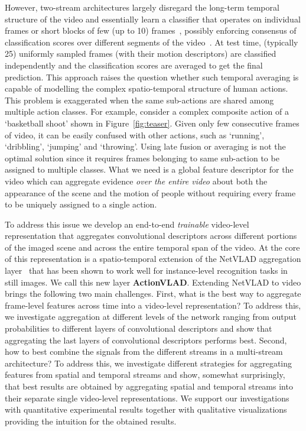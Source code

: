 \documentclass[10pt,twocolumn,letterpaper]{article}
\newcommand{\methodTag}[0]{ActionVLAD}
\begin{document}
However, two-stream architectures largely disregard the long-term  temporal structure of the video and essentially learn a classifier that operates on individual frames or short blocks of few (up to 10) frames~\cite{Simonyan_14b}, possibly enforcing consensus of classification scores  over different segments of the video~\cite{WangL_16a}.
At test time,  (typically 25) uniformly  sampled frames (with their motion descriptors) are classified independently and the classification scores are averaged to get the final prediction. 
This approach raises the question whether such temporal averaging is capable of modelling the complex
spatio-temporal structure of human actions. This problem is exaggerated
when the same sub-actions are
shared among multiple action classes.
For example,  consider a complex composite action of a `basketball shoot' shown in Figure~\ref{fig:teaser}.
Given only few consecutive frames of video, it can be easily confused with 
other actions, such as `running', `dribbling', `jumping' and `throwing'.
Using late fusion or averaging is not the optimal solution since it requires frames belonging to same sub-action to be assigned to multiple classes. What we need is a  global feature descriptor for the video which can  aggregate evidence {\em over the entire video} about both the appearance of the scene and the motion of people without requiring every frame to be uniquely assigned to a single action.


To address this issue we develop an end-to-end {\em trainable} video-level representation that aggregates convolutional descriptors across different portions of the imaged scene and across the entire temporal span of the video. At the core of this representation is a spatio-temporal extension of the NetVLAD aggregation layer~\cite{Arandjelovic16} that has been shown to work well 
for instance-level recognition tasks in still images. We call this new layer {\bf \methodTag{}}. 
Extending NetVLAD to video brings the following two main challenges.
First, what is the best way to aggregate frame-level features across time into a video-level representation? To address this, we investigate aggregation at different levels of the network ranging from output probabilities to different layers of convolutional descriptors and show that aggregating the last layers of convolutional descriptors performs best. 
Second, how to best combine the signals from the
different streams in a multi-stream architecture? To address this, we investigate different strategies for aggregating features from spatial and temporal streams and show, somewhat surprisingly, that best results are obtained by aggregating  spatial and temporal streams into their separate single video-level representations. 
We support our investigations with quantitative experimental results together with qualitative visualizations providing the intuition for the obtained results.
\end{document}
